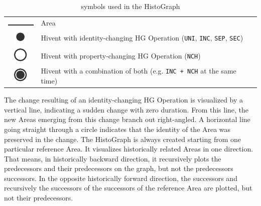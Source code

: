 \begin{table}[H]
\begin{center}
\begin{tabular}{c l}

  \raisebox{3.5\height}
  {\includegraphics{graphics/development/histograph/line}}
  & Area \\

  \raisebox{-0.2\height}
  {\includegraphics{graphics/development/histograph/circle_filled}}
  & Hivent with identity-changing HG Operation (\texttt{UNI}, \texttt{INC}, \texttt{SEP}, \texttt{SEC}) \\

  \raisebox{-0.2\height}
  {\includegraphics{graphics/development/histograph/circle_unfilled}}
  & Hivent with property-changing HG Operation (\texttt{NCH}) \\

  \raisebox{-0.2\height}
  {\includegraphics{graphics/development/histograph/circle_combo}}
  & Hivent with a combination of both (e.g. \texttt{INC + NCH} at the same time)

\end{tabular}
\caption{symbols used in the HistoGraph}
\label{tab:histograph_symbols}
\end{center}
\end{table}

The change resulting of an identity-changing HG Operation is visualized by a vertical line, indicating a sudden change with zero duration. From this line, the new Areas emerging from this change branch out right-angled. A horizontal line going straight through a circle indicates that the identity of the Area was preserved in the change. The HistoGraph is always created starting from one particular reference Area. It visualizes historically related Areas in one direction. That means, in historically backward direction, it recursively plots the predecessors and their predecessors on the graph, but not the predecessors successors. In the opposite historically forward direction, the successors and recursively the successors of the successors of the reference Area are plotted, but not their predecessors.

